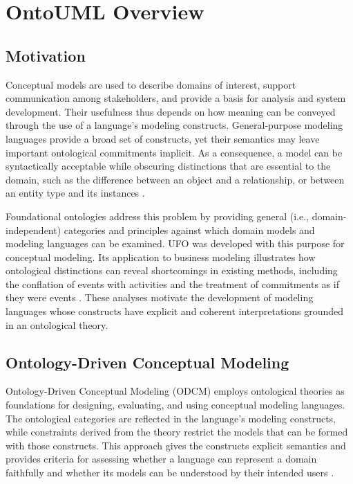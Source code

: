 \chapter{OntoUML Overview}

\section{Motivation}

Conceptual models are used to describe domains of interest, support communication among stakeholders, and provide a basis for analysis and system development. Their usefulness thus depends on how meaning can be conveyed through the use of a language's modeling constructs. General-purpose modeling languages provide a broad set of constructs, yet their semantics may leave important ontological commitments implicit. As a consequence, a model can be syntactically acceptable while obscuring distinctions that are essential to the domain, such as the difference between an object and a relationship, or between an entity type and its instances \cite{guizzardi_wagner_2010_ufo_foundation}.

Foundational ontologies address this problem by providing general (i.e., domain-independent) categories and principles against which domain models and modeling languages can be examined. UFO was developed with this purpose for conceptual modeling. Its application to business modeling illustrates how ontological distinctions can reveal shortcomings in existing methods, including the conflation of events with activities and the treatment of commitments as if they were events \cite{guizzardi_wagner_2005_business_modeling}. These analyses motivate the development of modeling languages whose constructs have explicit and coherent interpretations grounded in an ontological theory.

\section{Ontology-Driven Conceptual Modeling}

Ontology-Driven Conceptual Modeling (ODCM) employs ontological theories as foundations for designing, evaluating, and using conceptual modeling languages. The ontological categories are reflected in the language's modeling constructs, while constraints derived from the theory restrict the models that can be formed with those constructs. This approach gives the constructs explicit semantics and provides criteria for assessing whether a language can represent a domain faithfully and whether its models can be understood by their intended users \cite{guizzardi_wagner_2010_ufo_foundation}.

